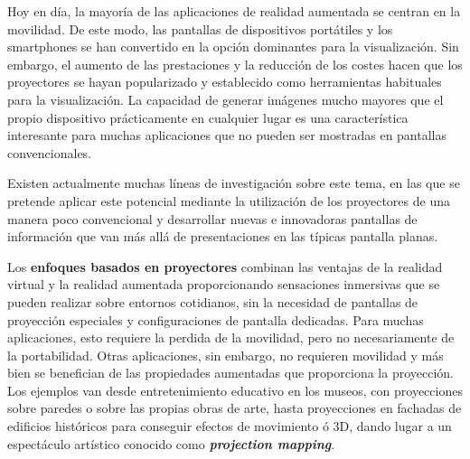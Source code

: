
Hoy en día, la mayoría de las aplicaciones de realidad aumentada se centran en la movilidad. De este modo, las pantallas de dispositivos portátiles y los smartphones se han convertido en la opción dominantes para la visualización. Sin embargo, el aumento de las prestaciones y la reducción de los costes hacen que los proyectores se hayan popularizado y establecido como herramientas habituales para la visualización. La capacidad de generar imágenes mucho mayores que el propio dispositivo prácticamente en cualquier lugar es una característica interesante para muchas aplicaciones que no pueden ser mostradas en pantallas convencionales. 

Existen actualmente muchas líneas de investigación sobre este tema, en las que se pretende aplicar este potencial mediante la utilización de los proyectores de una manera poco convencional y desarrollar nuevas e innovadoras pantallas de información que van más allá de presentaciones en las típicas pantalla planas.
 
Los \textbf{enfoques basados en proyectores} combinan las ventajas de la realidad virtual y la realidad aumentada proporcionando sensaciones inmersivas que se pueden realizar sobre entornos cotidianos, sin la necesidad de pantallas de proyección especiales y configuraciones de pantalla dedicadas. Para muchas aplicaciones, esto requiere la perdida de la movilidad, pero no necesariamente de la portabilidad. Otras aplicaciones, sin embargo, no requieren movilidad y más bien se benefician de las propiedades aumentadas que proporciona la proyección. Los ejemplos van desde entretenimiento educativo en los museos, con proyecciones sobre paredes o sobre las propias obras de arte, hasta proyecciones en fachadas de edificios históricos para conseguir efectos de movimiento ó 3D, dando lugar a un espectáculo artístico conocido como \textbf{\textit{projection mapping}}.

